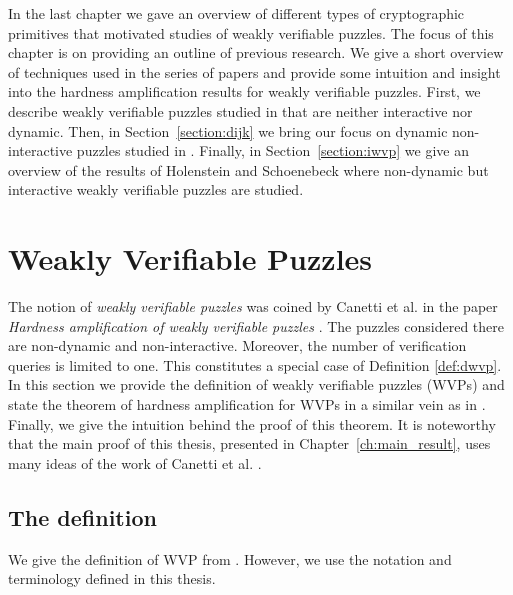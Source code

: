 \label{st:previous_results}
In the last chapter we gave an overview of different types of cryptographic primitives that motivated studies of weakly verifiable puzzles.
The focus of this chapter is on providing an outline of previous research.
We give a short overview of techniques used in the series of papers \cite{canetti2005hardness, dodis2009security, holenstein2011general}
and provide some intuition and insight into the hardness amplification results for weakly verifiable puzzles.
First, we describe weakly verifiable puzzles studied in \cite{canetti2005hardness} that are neither interactive nor dynamic.
Then, in Section~\ref{section:dijk} we bring our focus on dynamic non-interactive puzzles studied in \cite{dodis2009security}.
Finally, in Section~\ref{section:iwvp} we give an overview of the results of Holenstein and Schoenebeck \cite{holenstein2011general}
where non-dynamic but interactive weakly verifiable puzzles are studied.
%
\section{Weakly Verifiable Puzzles}
\label{subsec:chs}
The notion of \textit{weakly verifiable puzzles} was coined by Canetti et al. in the paper
\textit{Hardness amplification of weakly verifiable puzzles} \cite{canetti2005hardness}.
The puzzles considered there are non-dynamic and non-interactive.
Moreover, the number of verification queries is limited to one. This constitutes a special case of Definition \ref{def:dwvp}.
In this section we provide the definition of weakly verifiable puzzles (WVPs) and state the theorem of hardness amplification for WVPs
in a similar vein as in \cite{canetti2005hardness}.
Finally, we give the intuition behind the proof of this theorem. It is noteworthy that the main proof of this thesis,
presented in Chapter~\ref{ch:main_result}, uses many ideas of the work of Canetti et al. \cite{canetti2005hardness}.
%
\subsection{The definition}
We give the definition of WVP from \cite{canetti2005hardness}. However, we use the notation and terminology defined in this thesis.

